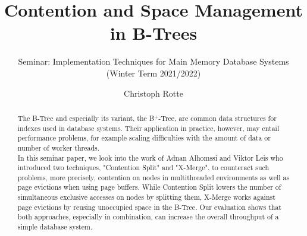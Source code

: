 \documentclass[acmlarge,nonacm,dvipsnames]{acmart}
\begin{document}
\title{Contention and Space Management in B-Trees}
\subtitle{Seminar: Implementation Techniques for Main Memory Database Systems (Winter Term 2021/2022)}

\author{Christoph Rotte}
\authorsaddresses{}

\begin{abstract}
The B-Tree and especially its variant, the B$^+$-Tree, are common data structures for indexes used in database systems. Their application in practice, however, may entail performance problems, for example scaling difficulties with the amount of data or number of worker threads.\\In this seminar paper, we look into the work of Adnan Alhomssi and Viktor Leis \cite{contention_space_management} who introduced two techniques, "Contention Split" and "X-Merge", to counteract such problems, more precisely, contention on nodes in multithreaded environments as well as page evictions when using page buffers. While Contention Split lowers the number of simultaneous exclusive accesses on nodes by splitting them, X-Merge works against page evictions by reusing unoccupied space in the B-Tree. Our evaluation shows that both approaches, especially in combination, can increase the overall throughput of a simple database system.
\end{abstract}

\maketitle
\end{document}

